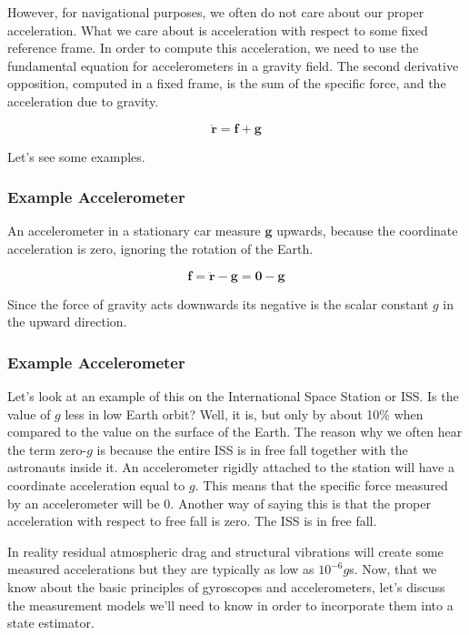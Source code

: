 However, for
navigational purposes, we often do not care about
our proper acceleration. What we care about is acceleration with
respect to some fixed reference frame. In order to compute this acceleration, we need
to use the fundamental equation for accelerometers in a gravity field. The second derivative opposition,
computed in a fixed frame, is the sum of the specific force,
and the acceleration due to gravity. 

\begin{equation}
\ddot{\mathbf{r}} = \mathbf{f} + \mathbf{g}
\end{equation}

Let's see some examples.

\subsubsection{Example Accelerometer}

An accelerometer in a stationary car measure $\mathbf{g}$ upwards, because the coordinate acceleration is
zero, ignoring the rotation of the Earth. 

\begin{equation}
\mathbf{f} = \ddot{\mathbf{r}} - \mathbf{g} = \mathbf{0} - \mathbf{g}
\end{equation}

Since the force of gravity acts downwards
its negative is the scalar constant $g$ in the upward direction. 


\subsubsection{Example Accelerometer}

Let's look at an example of this on
the International Space Station or ISS. Is the value of $g$ less in low Earth orbit? Well, it is, but only by about 10\% when compared to
the value on the surface of the Earth. The reason why we often hear the term zero-$g$ is because the entire ISS is in free fall together with
the astronauts inside it. An accelerometer rigidly attached to
the station will have a coordinate acceleration equal to $g$. This means that the specific force
measured by an accelerometer will be 0. Another way of saying this is that the
proper acceleration with respect to free fall is zero. The ISS is in free fall. 

In reality residual atmospheric drag and
structural vibrations will create some measured accelerations but they
are typically as low as $10^{-6}g$s. Now, that we know about the basic
principles of gyroscopes and accelerometers, let's discuss
the measurement models we'll need to know in order to
incorporate them into a state estimator. 

